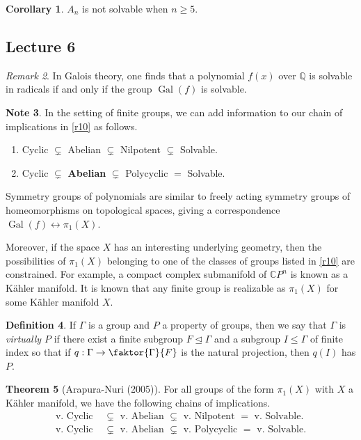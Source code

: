 \documentclass[10pt,letterpaper,cm]{nupset}
\theoremstyle{definition}
\newtheorem{definition}{Definition}[subsection]
\newtheorem{note}[definition]{Note}
\theoremstyle{theorem}
\newtheorem{theorem}[definition]{Theorem}
\newtheorem{corollary}[definition]{Corollary}
\theoremstyle{remark}
\newtheorem{remark}[definition]{Remark}
\newcommand{\CP}{\mathbb CP}
\newcommand{\Q}{\mathbb Q}
\newcommand{\1}{\mathbf{1}}
\newcommand{\0}{\vec 0}
\DeclareMathOperator{\gal}{Gal}
\begin{document}
\begin{corollary}
$A_n$ is not solvable when $n\geq 5$.
\end{corollary}

\subsection{Lecture 6}

\begin{remark}
In Galois theory, one finds that a polynomial $f(x)$ over $\Q$ is solvable in radicals if and only if the group $\gal(f)$ is solvable. 
\end{remark}

\medskip

\begin{note}
In the setting of finite groups, we can add information to our chain of implications in \cref{r10} as follows.
\begin{enumerate}[label=(\roman*)]
\item Cyclic $\subsetneq$ Abelian $\subsetneq$ Nilpotent $\subsetneq$ Solvable.
\item Cyclic $\subsetneq$ \textbf{Abelian} $\subsetneq$ Polycyclic $\bm =$  Solvable.
\end{enumerate}
\end{note}

\smallskip

Symmetry groups of polynomials are similar to freely acting symmetry groups of homeomorphisms on topological spaces, giving a correspondence $\gal(f) \longleftrightarrow \pi_1(X)$. 

Moreover, if the space $X$ has an interesting underlying geometry, then the possibilities of $\pi_1(X)$ belonging to one of the classes of groups listed in \cref{r10} are constrained. For example,
a compact complex submanifold of $\CP^n$ is known as a K\"ahler manifold. It is known that any finite group is realizable as $\pi_1(X)$ for some K\"ahler manifold $X$.

\begin{definition}
If $\Gamma$ is a group and $P$ a property of groups, then we say that $\Gamma$ is \textit{virtually $P$} if there exist a finite subgroup $F \unlhd \Gamma$ and a subgroup $I \leq \Gamma$ of finite index so that if $q: \Gamma \to \faktor{\Gamma}{F}$ is the natural projection, then $q(I)$ has $P$. 
\end{definition}

\begin{theorem}[Arapura-Nuri (2005)]
For all groups of the form $\pi_1(X)$ with $X$ a K\"ahler manifold, we have the following chains of implications.
\begin{align*}
 \text{v. Cyclic } &\subsetneq \text{ v. Abelian } \subsetneq \text{ v. Nilpotent } = \text{ v. Solvable}.
\\ \text{v. Cyclic } &  \subsetneq \text{ v. Abelian } \subsetneq \text{ v. Polycyclic } = \text{ v. Solvable}.
\end{align*}
\end{theorem}
\end{document}
